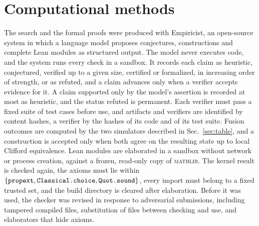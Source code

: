 \documentclass[aps,pra,onecolumn,superscriptaddress,nofootinbib,longbibliography]{revtex4-2}
\theoremstyle{plain}
\theoremstyle{remark}
\newcommand{\codeus}{\textunderscore\allowbreak}
\newcommand{\code}[1]{\texttt{\let\_\codeus #1}}
\begin{document}
\section{Computational methods}\label{sec:method}

The search and the formal proofs were produced with Empiricist, an open-source system in which a language
model proposes conjectures, constructions and complete Lean modules as structured output. The model never
executes code, and the system runs every check in a sandbox. It records each claim as heuristic,
conjectured, verified up to a given size, certified or formalized, in increasing order of strength, or as
refuted, and a claim advances only when a verifier accepts evidence for it. A claim supported only by the
model's assertion is recorded at most as heuristic, and the status refuted is permanent. Each verifier
must pass a fixed suite of test cases before use, and artifacts and verifiers are identified by content
hashes, a verifier by the hashes of its code and of its test suite. Fusion outcomes are computed by the two simulators described in Sec.~\ref{sec:table}, and a
construction is accepted only when both agree on the resulting state up to local Clifford equivalence.
Lean modules are elaborated in a sandbox without network or process creation, against a frozen,
read-only copy of \textsc{mathlib}. The kernel result is checked again, the axioms must lie within
$\{\code{propext},\code{Classical.choice},\code{Quot.sound}\}$, every import must belong to a fixed trusted
set, and the build directory is cleared after elaboration. Before it was used, the checker was revised in
response to adversarial submissions, including tampered compiled files, substitution of files between
checking and use, and elaborators that hide axioms.
\end{document}
